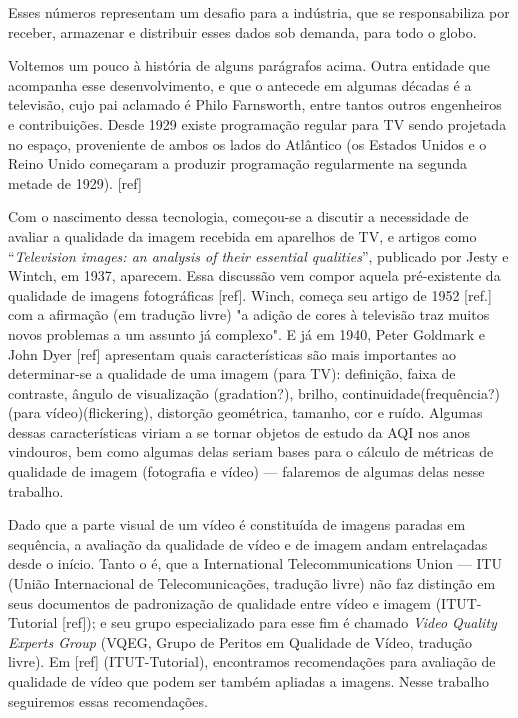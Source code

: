 	Esses números representam um desafio para a indústria, que se responsabiliza por receber, armazenar e distribuir esses dados sob demanda, para todo o globo.

	Voltemos um pouco à história de alguns parágrafos acima. Outra entidade que acompanha esse desenvolvimento, e que o antecede em algumas décadas é a televisão, cujo pai aclamado é Philo Farnsworth, entre tantos outros engenheiros e contribuições. %
	Desde 1929 existe programação regular para TV sendo projetada no espaço, proveniente de ambos os lados do Atlântico (os Estados Unidos e o Reino Unido começaram a produzir programação regularmente na segunda metade de 1929). [ref]

	Com o nascimento dessa tecnologia, começou-se a discutir a necessidade de avaliar a qualidade da imagem recebida em aparelhos de TV, e artigos como ``{\em Television images: an analysis of their essential qualities}'', publicado por Jesty e Wintch, em 1937, aparecem. Essa discussão vem compor aquela pré-existente da qualidade de imagens fotográficas [ref]. Winch, começa seu artigo de 1952 [ref.] com a afirmação (em tradução livre) "a adição de cores à televisão traz muitos novos problemas a um assunto já complexo". E já em 1940, Peter Goldmark e John Dyer [ref] apresentam quais características são mais importantes ao determinar-se a qualidade de uma imagem (para TV): definição, faixa de contraste, ângulo de visualização (gradation?), brilho, continuidade(frequência?) (para vídeo)(flickering), distorção geométrica, tamanho, cor e ruído. Algumas dessas características viriam a se tornar objetos de estudo da AQI nos anos vindouros, bem como algumas delas seriam bases para o cálculo de métricas de qualidade de imagem (fotografia e vídeo) --- falaremos de algumas delas nesse trabalho.

	Dado que a parte visual de um vídeo é constituída de imagens paradas em sequência, a avaliação da qualidade de vídeo e de imagem andam entrelaçadas desde o início. Tanto o é, que a International Telecommunications Union --- ITU (União Internacional de Telecomunicações, tradução livre) não faz distinção em seus documentos de padronização de qualidade entre vídeo e imagem (ITUT-Tutorial [ref]); e seu grupo especializado para esse fim é chamado {\em Video Quality Experts Group} (VQEG, Grupo de Peritos em Qualidade de Vídeo, tradução livre). Em [ref] (ITUT-Tutorial), encontramos recomendações para avaliação de qualidade de vídeo que podem ser também apliadas a imagens. Nesse trabalho seguiremos essas recomendações.

